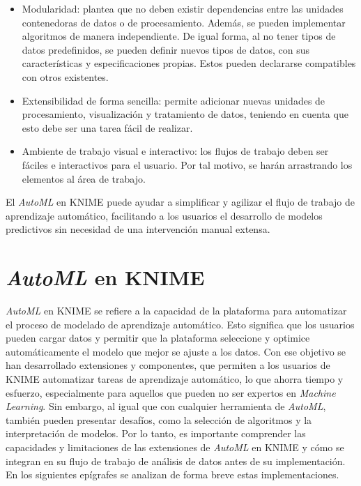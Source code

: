 \begin{itemize}
	\item Modularidad: plantea que no deben existir dependencias entre las unidades contenedoras de datos o de procesamiento. Además, se pueden implementar algoritmos de manera independiente. De igual forma, al no tener tipos de datos predefinidos, se pueden definir nuevos tipos de datos, con sus características y especificaciones propias. Estos pueden declararse compatibles con otros existentes.
	\item	Extensibilidad de forma sencilla: permite adicionar nuevas unidades de procesamiento, visualización y tratamiento de datos, teniendo en cuenta que esto debe ser una tarea fácil de realizar.
	\item	Ambiente de trabajo visual e interactivo: los flujos de trabajo deben ser fáciles e interactivos para el usuario. Por tal motivo, se harán arrastrando los elementos al área de trabajo.
\end{itemize}

El \textit{AutoML} en KNIME puede ayudar a simplificar y agilizar el flujo de trabajo de aprendizaje automático, facilitando a los usuarios el desarrollo de modelos predictivos sin necesidad de una intervención manual extensa.

\section{\textit{AutoML} en KNIME}
\textit{AutoML} en KNIME se refiere a la capacidad de la plataforma para automatizar el proceso de modelado de aprendizaje automático. Esto significa que los usuarios pueden cargar datos y permitir que la plataforma seleccione y optimice automáticamente el modelo que mejor se ajuste a los datos. Con ese objetivo se han desarrollado extensiones y componentes, que permiten a los usuarios de KNIME automatizar tareas de aprendizaje automático, lo que ahorra tiempo y esfuerzo, especialmente para aquellos que pueden no ser expertos en \textit{Machine Learning}. Sin embargo, al igual que con cualquier herramienta de \textit{AutoML}, también pueden presentar desafíos, como la selección de algoritmos y la interpretación de modelos. Por lo tanto, es importante comprender las capacidades y limitaciones de las extensiones de \textit{AutoML} en KNIME y cómo se integran en su flujo de trabajo de análisis de datos antes de su implementación. En los siguientes epígrafes se analizan de forma breve estas implementaciones.


